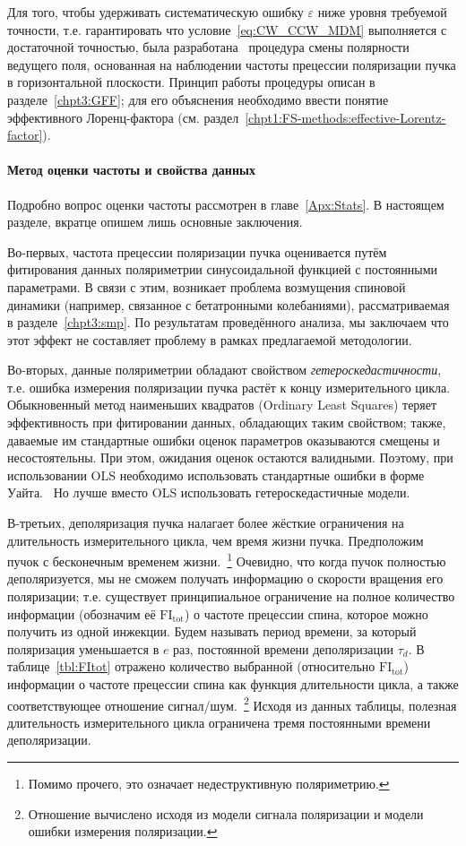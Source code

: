 Для того, чтобы удерживать систематическую ошибку $\varepsilon$ ниже уровня требуемой точности, т.е. гарантировать что условие~\eqref{eq:CW_CCW_MDM} выполняется с достаточной точностью, была разработана~\cite{Senichev:FDM} процедура смены полярности ведущего поля,
основанная на наблюдении частоты прецессии поляризации пучка в горизонтальной плоскости. 
Принцип работы процедуры описан в разделе~\ref{chpt3:GFF}; для его объяснения необходимо ввести понятие эффективного Лоренц-фактора (см. раздел~\ref{chpt1:FS-methods:effective-Lorentz-factor}).

\paragraph{Метод оценки частоты и  свойства данных}
Подробно вопрос оценки частоты рассмотрен в главе~\ref{Apx:Stats}. 
В настоящем разделе, вкратце опишем лишь основные заключения.

Во-первых, частота прецессии поляризации пучка оценивается путём 
фитирования данных поляриметрии синусоидальной функцией с постоянными параметрами. 
В связи с этим, возникает проблема возмущения спиновой динамики (например, 
связанное с бетатронными колебаниями), рассматриваемая в разделе~\ref{chpt3:smp}. 
По результатам проведённого анализа, мы заключаем что этот эффект 
не составляет проблему в рамках предлагаемой методологии.

Во-вторых, данные поляриметрии обладают свойством \emph{гетероскедастичности}, 
т.е. ошибка измерения поляризации пучка растёт к концу измерительного цикла.~\cite{Eversmann:Thesis}
Обыкновенный метод наименьших квадратов (Ordinary Least Squares) теряет эффективность 
при фитировании данных, обладающих таким свойством; также, даваемые им стандартные ошибки 
оценок параметров оказываются смещены и несостоятельны. При этом, ожидания оценок 
остаются валидными. Поэтому, при использовании OLS необходимо использовать стандартные ошибки 
в форме Уайта.~\cite{Stats:White:Robust-estimator} Но лучше вместо OLS использовать 
гетероскедастичные модели.~\cite{Stats:R:NLREG, Stats:HeteroskedasticNRM}

В-третьих, деполяризация пучка налагает более жёсткие ограничения на длительность измерительного цикла, 
чем время жизни пучка. Предположим пучок с бесконечным временем жизни.~\footnote{Помимо прочего, 
	это означает недеструктивную поляриметрию.} Очевидно, что когда пучок полностью деполяризуется, 
мы не сможем получать информацию о скорости вращения его поляризации; т.е. 
существует принципиальное ограничение на полное количество информации (обозначим её $\mathrm{FI_{tot}}$) 
о частоте прецессии спина, которое можно получить из одной инжекции. Будем называть период времени, 
за который поляризация уменьшается в $e$ раз, постоянной времени деполяризации $\tau_d$. 
В таблице~\ref{tbl:FItot} отражено количество выбранной (относительно $\mathrm{FI_{tot}}$) информации 
о частоте прецессии спина как функция длительности цикла, а также соответствующее отношение
сигнал/шум.~\footnote{Отношение вычислено исходя из модели сигнала поляризации и 
	модели ошибки измерения поляризации.} Исходя из данных таблицы, полезная 
длительность измерительного цикла ограничена тремя постоянными времени деполяризации.

